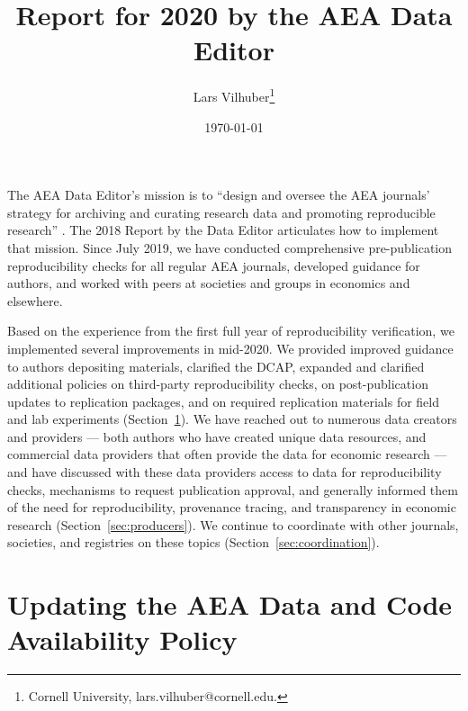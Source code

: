 \documentclass[PP]{AEA}
\begin{document}
\title{Report for 2020 by the AEA Data Editor }
\author{Lars Vilhuber\thanks{%
Cornell University, lars.vilhuber@cornell.edu. }
}
\date{\today}
\pubVolume{--}
\pubIssue{--}
\JEL{}




\maketitle

The \ac{AEA} Data Editor's  mission is to ``design  and  oversee  the  AEA  journals’  strategy for archiving and curating research data and promoting  reproducible  research'' \citep{10.1257/pandp.108.745}. The 2018 Report by the Data Editor \citep{10.1257/pandp.109.718} articulates how to implement that mission. Since July 2019, we have conducted comprehensive pre-publication reproducibility checks for all regular AEA journals, developed guidance for authors, and worked with peers at societies and groups in economics and elsewhere. 

Based on the experience from the first full year of reproducibility verification, we implemented several improvements in mid-2020. We provided improved guidance to authors depositing materials, clarified the \ac{DCAP}, expanded and clarified additional policies on third-party reproducibility checks, on post-publication updates to replication packages, and on required replication materials for field and lab experiments  (Section~\ref{sec:dcap}). We have reached out to numerous data creators and providers --- both authors who have created unique data resources, and commercial data providers that often provide the data for economic research --- and have discussed with these data providers access to data for reproducibility checks, mechanisms to request publication approval, and generally informed them of the need for reproducibility, provenance tracing, and transparency in economic research (Section~\ref{sec:producers}). 
We continue to coordinate with other journals, societies, and registries on these topics (Section~\ref{sec:coordination}).


\section{Updating the AEA Data and Code Availability Policy}
\label{sec:dcap}
\end{document}

